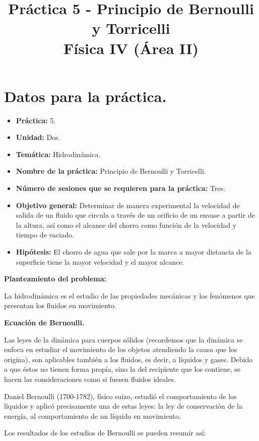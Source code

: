 \documentclass[14pt]{extarticle}
\title{\vspace*{-2cm} Práctica 5 - Principio de Bernoulli y Torricelli \\  Física IV (Área II) \vspace{-5ex}}
\date{}
\begin{document}
\maketitle

\section{Datos para la práctica.}

\begin{itemize}
\itemsep0em 
\item  \textbf{Práctica:} 5.
\item \textbf{Unidad:} Dos.
\item \textbf{Temática:} Hidrodinámica.
\item \textbf{Nombre de la práctica:} Principio de Bernoulli y Torricelli.
\item \textbf{Número de sesiones que se requieren para la práctica:} Tres.
\item \textbf{Objetivo general: } Determinar de manera experimental la velocidad de salida de un fluido que circula a través de un orificio de un envase a partir de la altura, así como el alcance del chorro como función de la velocidad y tiempo de vaciado.
\item \textbf{Hipótesis: } El chorro de agua que sale  por la marca a mayor distancia de la superficie tiene la mayor velocidad y el mayor alcance. 
\end{itemize}

\textbf{Planteamiento del problema:} 

La hidrodinámica es el estudio de las propiedades mecánicas y los fenómenos que presentan los fluidos en movimiento.

\textbf{Ecuación de Bernoulli.}

Las leyes de la dinámica para cuerpos sólidos (recordemos que la dinámica se enfoca en estudiar el movimiento de los objetos atendiendo la causa que los origina), son aplicables también a los fluidos, es decir, a líquidos y gases. Debido a que éstos no tienen forma propia, sino la del recipiente que los contiene, se hacen las consideraciones como si fuesen fluidos ideales.

Daniel Bernoulli (1700-1782), físico suizo, estudió el comportamiento de los líquidos y aplicó precisamente una de estas leyes: la ley de conservación de la energía, al comportamiento de un líquido en movimiento.

Los resultados de los estudios de Bernoulli se pueden resumir así:
\end{document}
